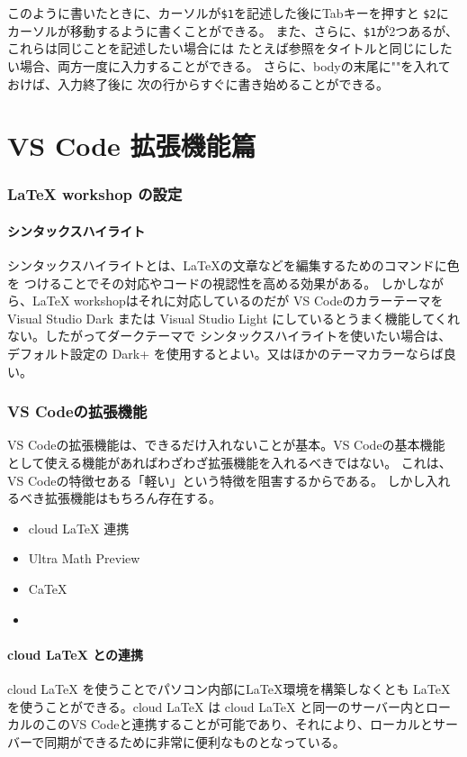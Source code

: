 \documentclass{ltjsarticle}
\begin{document}
このように書いたときに、カーソルが\verb|$1|を記述した後にTabキーを押すと
\verb|$2|にカーソルが移動するように書くことができる。
また、さらに、\verb|$1|が2つあるが、これらは同じことを記述したい場合には
たとえば参照をタイトルと同じにしたい場合、両方一度に入力することができる。
さらに、bodyの末尾に""を入れておけば、入力終了後に
次の行からすぐに書き始めることができる。


\part{VS Code 拡張機能篇}
\section{LaTeX workshop の設定}
\subsection{シンタックスハイライト}
シンタックスハイライトとは、\LaTeX の文章などを編集するためのコマンドに色を
つけることでその対応やコードの視認性を高める効果がある。
しかしながら、LaTeX workshopはそれに対応しているのだが
VS CodeのカラーテーマをVisual Studio Dark または Visual Studio Light
にしているとうまく機能してくれない。したがってダークテーマで
シンタックスハイライトを使いたい場合は、デフォルト設定の
Dark+ を使用するとよい。又はほかのテーマカラーならば良い。

\section{VS Codeの拡張機能}
VS Codeの拡張機能は、できるだけ入れないことが基本。VS Codeの基本機能
として使える機能があればわざわざ拡張機能を入れるべきではない。
これは、VS Codeの特徴セある「軽い」という特徴を阻害するからである。
しかし入れるべき拡張機能はもちろん存在する。
\begin{itemize}
\item cloud LaTeX 連携
\item Ultra Math Preview
\item CaTeX
\item 
\end{itemize}

\subsection{cloud LaTeX との連携}
cloud LaTeX を使うことでパソコン内部に\LaTeX 環境を構築しなくとも
\LaTeX を使うことができる。cloud  LaTeX は cloud LaTeX と同一のサーバー内とローカルのこのVS Codeと連携することが可能であり、それにより、ローカルとサーバーで同期ができるために非常に便利なものとなっている。
\end{document}
